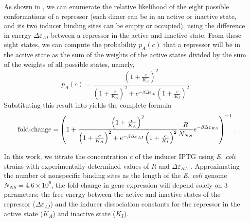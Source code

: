 As shown in \fref[figrepressorInducerStates], we can enumerate the relative
likelihood of the eight possible conformations of a repressor (each dimer
can be in an active or inactive state, and its two inducer binding sites
can be empty or occupied), using the difference in energy $\Delta \varepsilon_{AI}$ between a
repressor in the active and inactive state. From these eight states, we can
compute the probability $p_A(c)$ that a repressor will be in the active state
as the sum of the weights of the active states divided by the sum of the weights
of all possible states, namely,
\begin{equation}\label{eq6}
p_A(c)=\frac{\left(1+\frac{c}{K_A}\right)^2}{\left(1+\frac{c}{K_A}\right)^2+e^{-\beta  \Delta \varepsilon_{AI} }\left(1+\frac{c}{K_I}\right)^2}.
\end{equation}
Substituting this result into \eref[eq5] yields the
complete formula
\begin{equation}\label{eq7}
\operatorname{fold-change}= \left(
1+\frac{\left(1+\frac{c}{K_A}\right)^2}{\left(1+\frac{c}{K_A}\right)^2+e^{-\beta  \Delta \varepsilon_{AI} }\left(1+\frac{c}{K_I}\right)^2}\frac{R}{N_{NS}}e^{-\beta \Delta\varepsilon_{RA}} \right)^{-1}.
\end{equation}

In this work, we titrate the concentration \(c\) of the inducer IPTG using
\textit{E. coli} strains with experimentally determined values of $R$ and
$\Delta\varepsilon_{RA}$ \cite{Garcia2011}. Approximating the number of
nonspecific binding sites as the length of the \textit{E. coli} genome $N_{NS} =
4.6 \times 10^6$, the
fold-change in gene expression will depend solely on 3 parameters: the free
energy between the active and inactive states of the repressor
($\Delta\varepsilon_{AI}$) and the inducer dissociation constants for the
repressor in the active state ($K_A$) and inactive state ($K_I$).
